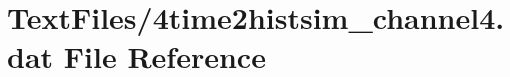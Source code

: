 \hypertarget{4time2histsim__channel4_8dat}{}\section{Text\+Files/4time2histsim\+\_\+channel4.dat File Reference}
\label{4time2histsim__channel4_8dat}
